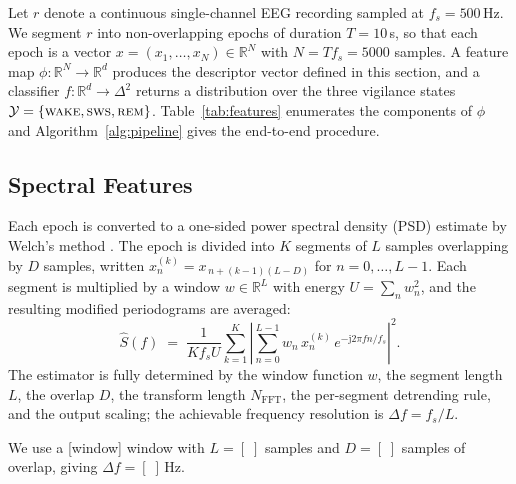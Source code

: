 Let $r$ denote a continuous single-channel EEG recording sampled at
$f_s = 500$\,Hz. We segment $r$ into non-overlapping epochs of duration
$T = 10$\,s, so that each epoch is a vector
$x = (x_1,\dots,x_N) \in \mathbb{R}^{N}$ with $N = T f_s = 5000$ samples.
A feature map $\phi : \mathbb{R}^{N} \to \mathbb{R}^{d}$ produces the
descriptor vector defined in this section, and a classifier
$f : \mathbb{R}^{d} \to \Delta^{2}$ returns a distribution over the three
vigilance states $\mathcal{Y} = \{\textsc{wake}, \textsc{sws},
\textsc{rem}\}$. Table~\ref{tab:features} enumerates the components of
$\phi$ and Algorithm~\ref{alg:pipeline} gives the end-to-end procedure.


\subsection{Spectral Features}
\label{subsec:spectral}

Each epoch is converted to a one-sided power spectral density (PSD)
estimate by Welch's method \citep{welch1967}. The epoch is divided into
$K$ segments of $L$ samples overlapping by $D$ samples, written
$x^{(k)}_n = x_{\,n + (k-1)(L-D)}$ for $n = 0, \dots, L-1$. Each segment is
multiplied by a window $w \in \mathbb{R}^{L}$ with energy
$U = \sum_{n} w_n^{2}$, and the resulting modified periodograms are
averaged:
%
\begin{equation}
\label{eq:welch}
\hat{S}(f) \;=\;
\frac{1}{K f_s U}
\sum_{k=1}^{K}
\left|
\sum_{n=0}^{L-1} w_n\, x^{(k)}_n\,
e^{-\mathrm{j} 2\pi f n / f_s}
\right|^{2}.
\end{equation}
%
The estimator is fully determined by the window function $w$, the segment
length $L$, the overlap $D$, the transform length $N_{\mathrm{FFT}}$, the
per-segment detrending rule, and the output scaling; the achievable
frequency resolution is $\Delta f = f_s / L$.

\noindent
We use a [window] window with $L = [\;]$ samples and $D = [\;]$ samples of
overlap, giving $\Delta f = [\;]$\,Hz.

